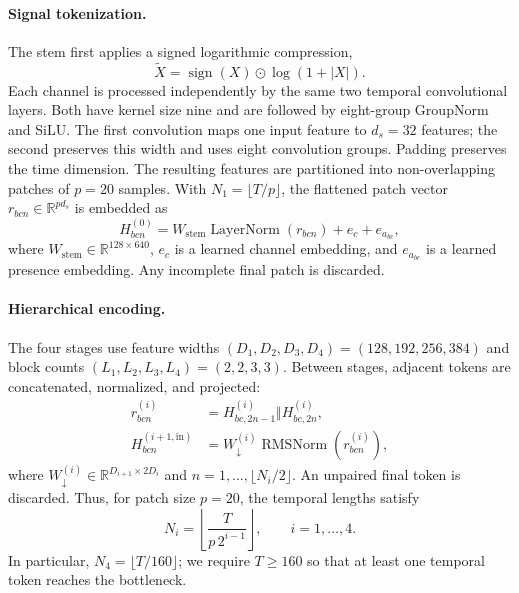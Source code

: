 \documentclass{article}
\DeclareMathOperator{\RN}{RMSNorm}
\DeclareMathOperator{\LN}{LayerNorm}
\begin{document}
\paragraph{Signal tokenization.}
The stem first applies a signed logarithmic compression,
\begin{equation}
    \widetilde X=\operatorname{sign}(X)\odot\log(1+|X|).
    \label{eq:signed-log}
\end{equation}
Each channel is processed independently by the same two temporal convolutional
layers. Both have kernel size nine and are followed by eight-group GroupNorm
and SiLU. The first convolution maps one input feature to $d_s=32$ features;
the second preserves this width and uses eight convolution groups.
Padding preserves the time dimension. The resulting features are partitioned
into non-overlapping patches of $p=20$ samples. With
$N_1=\lfloor T/p\rfloor$, the flattened patch vector
$r_{bcn}\in\mathbb{R}^{pd_s}$ is embedded as
\begin{equation}
    H^{(0)}_{bcn}
    =W_{\mathrm{stem}}\LN(r_{bcn})+e_c+e_{a_{bc}},
    \label{eq:patch-embedding}
\end{equation}
where $W_{\mathrm{stem}}\in\mathbb{R}^{128\times640}$, $e_c$ is a learned
channel embedding, and $e_{a_{bc}}$ is a learned presence embedding.
Any incomplete final patch is discarded.

\paragraph{Hierarchical encoding.}
The four stages use feature widths
$(D_1,D_2,D_3,D_4)=(128,192,256,384)$ and block counts
$(L_1,L_2,L_3,L_4)=(2,2,3,3)$. Between stages, adjacent tokens are concatenated,
normalized, and projected:
\begin{align}
    r^{(i)}_{bcn}
      &=H^{(i)}_{bc,2n-1}\Vert H^{(i)}_{bc,2n},\\
    H^{(i+1,\mathrm{in})}_{bcn}
      &=W_{\downarrow}^{(i)}\RN(r^{(i)}_{bcn}),
    \label{eq:downsampling}
\end{align}
where $W_{\downarrow}^{(i)}\in\mathbb{R}^{D_{i+1}\times2D_i}$ and
$n=1,\ldots,\lfloor N_i/2\rfloor$. An unpaired final token is discarded.
Thus, for patch size $p=20$, the temporal lengths satisfy
\begin{equation}
    N_i=\left\lfloor\frac{T}{p\,2^{i-1}}\right\rfloor,
    \qquad i=1,\ldots,4.
    \label{eq:stage-lengths}
\end{equation}
In particular, $N_4=\lfloor T/160\rfloor$; we require $T\geq160$ so that
at least one temporal token reaches the bottleneck.
\end{document}
